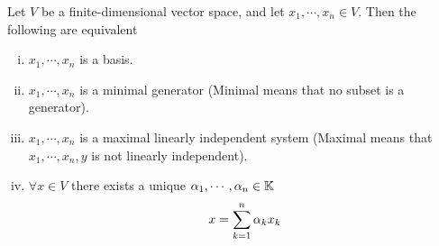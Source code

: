 \documentclass[../../script.tex]{subfiles}
\begin{document}
\begin{thm}
Let $V$ be a finite-dimensional vector space, and let $x_1, \cdots, x_n \in V$. Then the following are equivalent
\begin{enumerate}[(i)]
	\item $x_1, \cdots, x_n$ is a basis.
	\item $x_1, \cdots, x_n$ is a minimal generator (Minimal means that no subset is a generator).
	\item $x_1, \cdots, x_n$ is a maximal linearly independent system (Maximal means that $x_1, \cdots, x_n, y$ is not linearly independent).
	\item $\forall x \in V$ there exists a unique $\alpha_1, \cdots, \alpha_n \in \field$
	\[
		x = \series[n]{k} \alpha_k x_k
	\]
\end{enumerate}
\end{thm}
\end{document}
